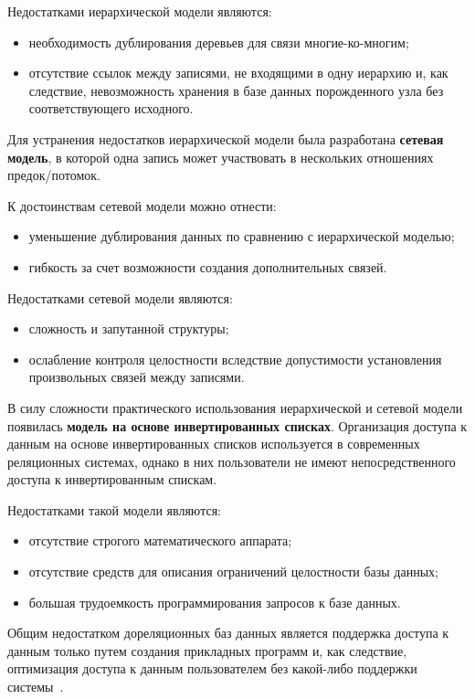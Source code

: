 Недостатками иерархической модели являются:
\begin{itemize}
    \item необходимость дублирования деревьев для связи многие-ко-многим;
    \item отсутствие ссылок между записями, не входящими в одну иерархию и, как
        следствие, невозможность хранения в базе данных порожденного узла без
        соответствующего исходного.
\end{itemize}

Для устранения недостатков иерархической модели была разработана
\textbf{сетевая модель}, в которой одна запись может участвовать в нескольких
отношениях предок/потомок.

К достоинствам сетевой модели можно отнести:
\begin{itemize}
    \item уменьшение дублирования данных по сравнению с иерархической моделью;
    \item гибкость за счет возможности создания дополнительных связей.
\end{itemize}

Недостатками сетевой модели являются:
\begin{itemize}
    \item сложность и запутанной структуры;
    \item ослабление контроля целостности вследствие допустимости установления
        произвольных связей между записями.
\end{itemize}

В силу сложности практического использования иерархической и сетевой модели
появилась \textbf{модель на основе инвертированных списках}. Организация доступа
к данным на основе инвертированных списков используется в современных
реляционных системах, однако в них пользователи не имеют непосредственного
доступа к инвертированным спискам.

Недостатками такой модели являются:
\begin{itemize}
    \item отсутствие строгого математического аппарата;
    \item отсутствие средств для описания ограничений целостности базы данных;
    \item большая трудоемкость программирования запросов к базе данных.
\end{itemize}

Общим недостатком дореляционных баз данных является поддержка доступа к данным
только путем создания прикладных программ и, как следствие, оптимизация доступа
к данным пользователем без какой-либо поддержки системы~\cite{book01}.


